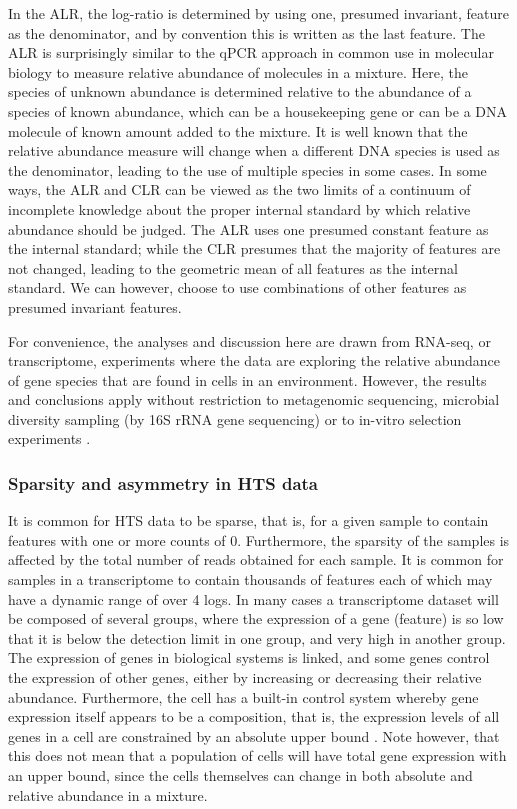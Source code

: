 \documentclass [10pt]{article}
\begin{document}
In the ALR, the log-ratio is determined by using one, presumed invariant, feature as the denominator, and by convention this is written as the last feature. The ALR is surprisingly similar to the qPCR approach in common use in molecular biology to measure relative abundance of molecules in a mixture. Here, the species of unknown abundance is determined relative to the abundance of a species of known abundance, which can be a housekeeping gene or can be a DNA molecule of known amount added to the mixture. It is well known that the relative abundance measure will change when a different DNA species is used as the denominator, leading to the use of multiple species in some cases. In some ways, the ALR and CLR can be viewed as the two limits of a continuum of incomplete knowledge about the proper internal standard by which relative abundance should be judged. The ALR uses one presumed constant feature as the internal standard; while the CLR  presumes that the majority of features are not changed, leading to the geometric mean of all features as the internal standard. We can however, choose to use combinations of other features as presumed invariant features.

For convenience, the analyses and discussion here are drawn from RNA-seq, or transcriptome, experiments where the data are exploring the relative abundance of gene species that are found in cells in an environment. However, the results and conclusions apply without restriction to metagenomic sequencing, microbial diversity sampling (by 16S rRNA gene sequencing) or to in-vitro selection experiments . 

\subsubsection{Sparsity and asymmetry in HTS data}
\vskip-0.25cm
It is common for HTS data to be sparse, that is, for a given sample to contain features with one or more counts of 0. Furthermore, the sparsity of the samples is affected by the total number of reads obtained for each sample. It is common for samples in a transcriptome to contain thousands of features each of which may have a dynamic range of over 4 logs. In many cases a transcriptome dataset will be composed of several groups, where the expression of a gene (feature) is so low that it is below the detection limit in one group, and very high in another group. The expression of genes in biological systems is linked, and some genes control the expression of other genes, either by increasing or decreasing their relative abundance. Furthermore, the cell has a built-in control system whereby gene expression itself appears to be a composition, that is, the expression levels of all genes in a cell are constrained by an absolute upper bound  . Note however, that this does not mean that a population of cells will have total gene expression with an upper bound, since the cells themselves can change in both absolute and relative abundance in a mixture. 
\end{document}
